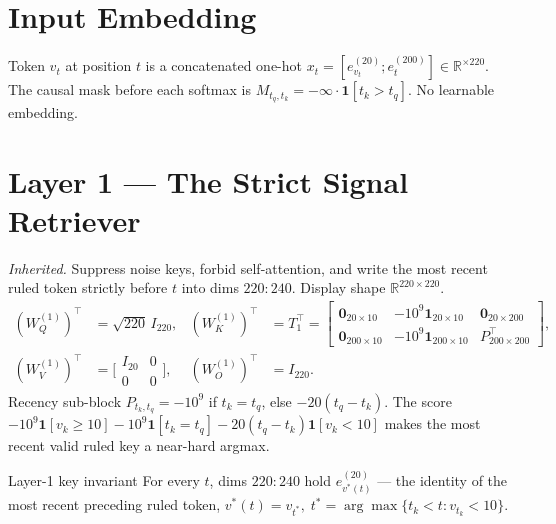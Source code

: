 \documentclass[11pt]{article}
\newcommand{\ev}[2]{e^{(#1)}_{#2}}
\newcommand{\R}{\mathbb{R}}
\newcommand{\T}{^{\!\top}}
\newcommand{\one}{\mathbf{1}}
\newcommand{\zeros}{\mathbf{0}}
\newcommand{\vstar}{v^{*}}
\begin{document}
\section{Input Embedding}
Token $v_t$ at position $t$ is a concatenated one-hot $x_t=[\ev{20}{v_t};\ev{200}{t}]\in\R^{\times220}$.
The causal mask before each softmax is $M_{t_q,t_k}=-\infty\cdot\one[t_k>t_q]$. No learnable embedding.

\section{Layer 1 --- The Strict Signal Retriever}
\emph{Inherited.} Suppress noise keys, forbid self-attention, and write the most recent ruled token
strictly before $t$ into dims $220{:}240$. Display shape $\R^{220\times220}$.
\begin{align}
(W^{(1)}_Q)\T &=\sqrt{220}\,I_{220}, &
(W^{(1)}_K)\T &= T_1\T=\begin{bmatrix}\zeros_{20\times10}&-10^9\one_{20\times10}&\zeros_{20\times200}\\
\zeros_{200\times10}&-10^9\one_{200\times10}&P\T_{200\times200}\end{bmatrix},\\
(W^{(1)}_V)\T &=\Big[\begin{smallmatrix}I_{20}&0\\0&0\end{smallmatrix}\Big], &
(W^{(1)}_O)\T &= I_{220}.
\end{align}
Recency sub-block $P_{t_k,t_q}=-10^9$ if $t_k=t_q$, else $-20(t_q-t_k)$. The score
$-10^9\one[v_k\!\ge\!10]-10^9\one[t_k\!=\!t_q]-20(t_q-t_k)\one[v_k\!<\!10]$ makes the most recent valid
ruled key a near-hard argmax.
\begin{invbox}{Layer-1 key invariant}
For every $t$, dims $220{:}240$ hold $\ev{20}{\vstar(t)}$ --- the identity of the most recent preceding
ruled token, $\vstar(t)=v_{t^*},\;t^*=\arg\max\{t_k<t:v_{t_k}<10\}$.
\end{invbox}

\end{document}
